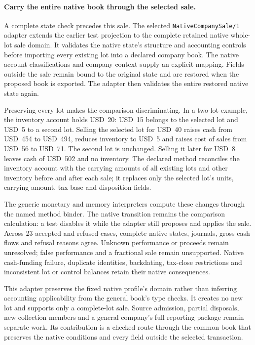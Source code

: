 \paragraph{Carry the entire native book through the selected sale.}
A complete state check precedes this sale. The selected
\texttt{NativeCompanySale/1} adapter extends the earlier test projection to the complete retained native whole-lot sale domain. It validates
the native state's structure and accounting controls before importing every
existing lot into a declared company book. The native account classifications
and company context supply an explicit mapping. Fields outside the sale remain
bound to the original state and are restored when the proposed book is exported.
The adapter then validates the entire restored native state again.

Preserving every lot makes the comparison discriminating. In a two-lot example,
the inventory account holds USD~20: USD~15 belongs to the selected lot and USD~5
to a second lot. Selling the selected lot for USD~40 raises cash from USD~454
to USD~494, reduces inventory to USD~5 and raises cost of sales from USD~56 to
USD~71. The second lot is unchanged. Selling it later for USD~8 leaves cash of
USD~502 and no inventory. The declared method reconciles the inventory account
with the carrying amounts of all existing lots and other inventory before and
after each sale; it replaces only the selected lot's units, carrying amount,
tax base and disposition fields.

The generic monetary and memory interpreters compute these changes through the
named method binder. The native transition remains the comparison calculation:
a test disables it while the adapter still proposes and applies the sale. Across
23 accepted and refused cases, complete native states, journals, gross cash flows
and refusal reasons agree. Unknown performance or proceeds remain unresolved;
false performance and a fractional sale remain unsupported. Native cash-funding
failure, duplicate identities, backdating, tax-close restrictions and inconsistent
lot or control balances retain their native consequences.

This adapter preserves the fixed native profile's domain rather than inferring
accounting applicability from the general book's type checks. It creates no new
lot and supports only a complete-lot sale. Source admission, partial disposals,
new collection members and a general company's full reporting package remain
separate work. Its contribution is a checked route through the common book that
preserves the native conditions and every field outside the selected transaction.
